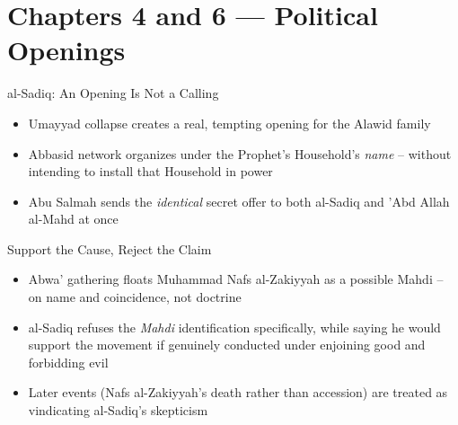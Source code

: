 \section{Chapters 4 and 6 — Political Openings}


\begin{frame}{al-Sadiq: An Opening Is Not a Calling}
\begin{itemize}[itemsep=5pt]
  \item Umayyad collapse creates a real, tempting opening for the Alawid family
  \item Abbasid network organizes under the Prophet's Household's \emph{name} -- without intending to install that Household in power
  \item Abu Salmah sends the \emph{identical} secret offer to both al-Sadiq and 'Abd Allah al-Mahd at once
\end{itemize}
\end{frame}

\begin{frame}{Support the Cause, Reject the Claim}
\begin{itemize}[itemsep=5pt]
  \item Abwa' gathering floats Muhammad Nafs al-Zakiyyah as a possible Mahdi -- on name and coincidence, not doctrine
  \item al-Sadiq refuses the \emph{Mahdi} identification specifically, while saying he would support the movement if genuinely conducted under enjoining good and forbidding evil
  \item Later events (Nafs al-Zakiyyah's death rather than accession) are treated as vindicating al-Sadiq's skepticism
\end{itemize}
\end{frame}

